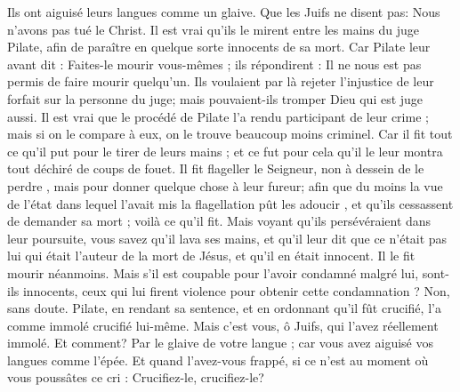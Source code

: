 Ils ont aiguisé leurs langues comme un glaive. Que les Juifs ne disent pas: Nous n’avons pas tué le Christ. Il est vrai qu’ils le mirent entre les mains du juge Pilate, afin de paraître en quelque sorte innocents de sa mort. Car Pilate leur avant dit : Faites-le mourir vous-mêmes ; ils répondirent : Il ne nous est pas permis de faire mourir quelqu’un. Ils voulaient par là rejeter l’injustice de leur forfait sur la personne du juge; mais pouvaient-ils tromper Dieu qui est juge aussi. Il est vrai que le procédé de Pilate l’a rendu participant de leur crime ; mais si on le compare à eux, on le trouve beaucoup moins criminel. Car il fit tout ce qu’il put pour le tirer de leurs mains ; et ce fut pour cela qu’il le leur montra tout déchiré de coups de fouet. Il fit flageller le Seigneur, non à dessein de le perdre , mais pour donner quelque chose à leur fureur; afin que du moins la vue de l’état dans lequel l’avait mis la flagellation pût les adoucir , et qu’ils cessassent de demander sa mort ; voilà ce qu’il fit. Mais voyant qu’ils persévéraient dans leur poursuite, vous savez qu’il lava ses mains, et qu’il leur dit que ce n’était pas lui qui était l’auteur de la mort de Jésus, et qu’il en était innocent. Il le fit mourir néanmoins. Mais s’il est coupable pour l’avoir condamné malgré lui, sont-ils innocents, ceux qui lui firent violence pour obtenir cette condamnation ? Non, sans doute. Pilate, en rendant sa sentence, et en ordonnant qu’il fût crucifié, l’a comme immolé crucifié lui-même. Mais c’est vous, ô Juifs, qui l’avez réellement immolé. Et comment? Par le glaive de votre langue ; car vous avez aiguisé vos langues comme l’épée. Et quand l’avez-vous frappé, si ce n’est au moment où vous poussâtes ce cri : Crucifiez-le, crucifiez-le?